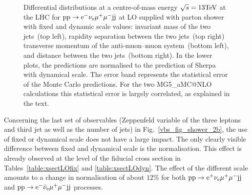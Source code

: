 \documentclass[11pt]{cernrep}
\makeatletter
\newcommand{\MGaMC}{M\protect\scalebox{0.8}{AD}G\protect\scalebox{0.8}{RAPH}5\_aMC@NLO\xspace}
\makeatother
\begin{document}
\begin{figure}[htbp]
\begin{center}
\caption{Differential distributions at a centre-of-mass energy $\sqrt{s}=13{\rm TeV}$ at the LHC for ${\rm p} {\rm p}
  \to {\rm e}^-  \nu_{\rm e}  \mu^+ \mu^- {\rm j} {\rm j}$ at LO supplied with parton shower with fixed and dynamic scale values:  
                invariant mass of the two jets~(top left),
                rapidity separation between the two jets~(top right)
                transverse momentum of the anti-muon--muon system~(bottom left), and
                distance between the two jets~(bottom right).
                In the lower plots, the predictions are normalised to the prediction of {\sc Sherpa} with
                dynamical scale. The error band represents
                the statistical error of the Monte Carlo predictions. For the two \MGaMC
                calculations this statistical error is largely correlated, as explained in the text.}
\label{vbs_fig_shower_2a}
\end{center}
\end{figure}

Concerning the last set of observables (Zeppenfeld variable of the three leptons and third jet as well as the number of jets) in Fig.~\ref{vbs_fig_shower_2b}, the use of fixed or dynamical scale does not have a large impact.
The only clearly visible difference between fixed and dynamical scale is the normalisation.
This effect is already observed at the level of the fiducial cross section in Tables~\ref{table:xsectLOfix} and \ref{table:xsectLOdyn}.
The effect of the different scale amounts to a change in normalisation of about $12\%$ for both ${\rm p}{\rm p}\to{\rm e}^+\nu_{\rm e}\mu^+\mu^-{\rm j}{\rm j}$ and ${\rm p}{\rm p}\to{\rm e}^-\bar\nu_{\rm e}\mu^+\mu^-{\rm j}{\rm j}$ processes.
\end{document}
